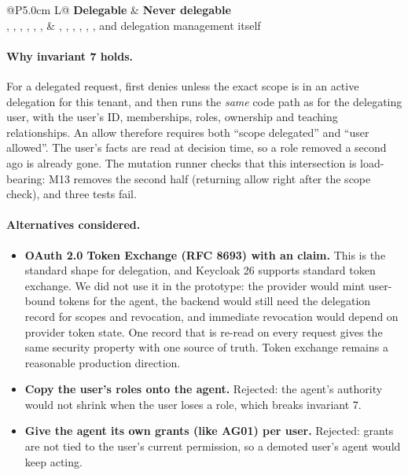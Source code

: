 \begin{table}[H]
\centering
\small
\begin{tabularx}{\textwidth}{@{}P{5.0cm} L@{}}
\toprule
\textbf{Delegable} & \textbf{Never delegable}\\
\midrule
{}, , , , , ,  & , , , , , , and delegation management itself\\
\bottomrule
\end{tabularx}
\caption{Delegable scopes. A delegable scope still grants nothing the user cannot do.}
\label{tab:scopes}
\end{table}

\paragraph{Why invariant 7 holds.} For a delegated request,  first denies unless the exact scope is in an active delegation for this tenant, and then runs the \emph{same} code path as for the delegating user, with the user's ID, memberships, roles, ownership and teaching relationships. An allow therefore requires both ``scope delegated'' and ``user allowed''. The user's facts are read at decision time, so a role removed a second ago is already gone. The mutation runner checks that this intersection is load-bearing: M13 removes the second half (returning allow right after the scope check), and three tests fail.

\paragraph{Alternatives considered.}
\begin{itemize}
  \item \textbf{OAuth 2.0 Token Exchange (RFC 8693) with an  claim.} This is the standard shape for delegation, and Keycloak 26 supports standard token exchange. We did not use it in the prototype: the provider would mint user-bound tokens for the agent, the backend would still need the delegation record for scopes and revocation, and immediate revocation would depend on provider token state. One record that is re-read on every request gives the same security property with one source of truth. Token exchange remains a reasonable production direction.
  \item \textbf{Copy the user's roles onto the agent.} Rejected: the agent's authority would not shrink when the user loses a role, which breaks invariant 7.
  \item \textbf{Give the agent its own grants (like AG01) per user.} Rejected: grants are not tied to the user's current permission, so a demoted user's agent would keep acting.
\end{itemize}

